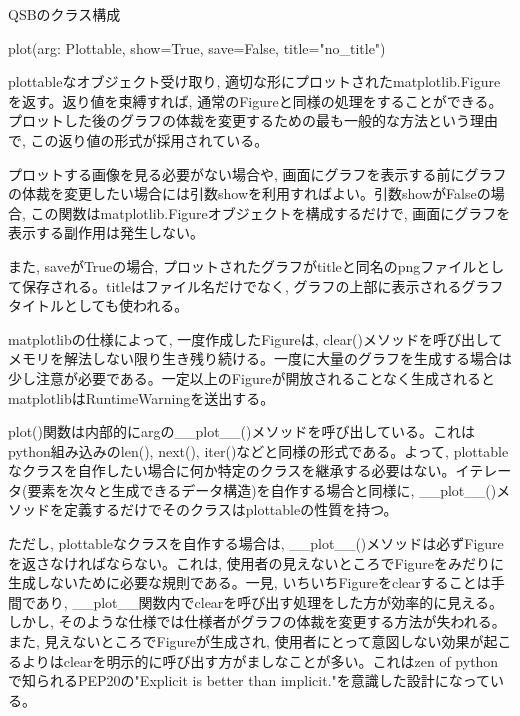\documentclass[a4paper, lualatex]{bxjsarticle}
\begin{document}
\begin{section}{QSBのクラス構成\label{AppQ}}
    \begin{section}{plot(arg: Plottable, show=True, save=False, title="no\_title")}
        \par plottableなオブジェクト受け取り, 適切な形にプロットされたmatplotlib.Figureを返す。返り値を束縛すれば, 通常のFigureと同様の処理をすることができる。プロットした後のグラフの体裁を変更するための最も一般的な方法という理由で, この返り値の形式が採用されている。
        \par プロットする画像を見る必要がない場合や, 画面にグラフを表示する前にグラフの体裁を変更したい場合には引数showを利用すればよい。引数showがFalseの場合, この関数はmatplotlib.Figureオブジェクトを構成するだけで, 画面にグラフを表示する副作用は発生しない。
        \par また, saveがTrueの場合, プロットされたグラフがtitleと同名のpngファイルとして保存される。titleはファイル名だけでなく, グラフの上部に表示されるグラフタイトルとしても使われる。
        \par matplotlibの仕様によって, 一度作成したFigureは, clear()メソッドを呼び出してメモリを解法しない限り生き残り続ける。一度に大量のグラフを生成する場合は少し注意が必要である。一定以上のFigureが開放されることなく生成されるとmatplotlibはRuntimeWarningを送出する。
        \par plot()関数は内部的にargの\_\_plot\_\_()メソッドを呼び出している。これはpython組み込みのlen(), next(), iter()などと同様の形式である。よって, plottableなクラスを自作したい場合に何か特定のクラスを継承する必要はない。イテレータ(要素を次々と生成できるデータ構造)を自作する場合と同様に, \_\_plot\_\_()メソッドを定義するだけでそのクラスはplottableの性質を持つ。
        \par ただし, plottableなクラスを自作する場合は, \_\_plot\_\_()メソッドは必ずFigureを返さなければならない。これは, 使用者の見えないところでFigureをみだりに生成しないために必要な規則である。一見, いちいちFigureをclearすることは手間であり, \_\_plot\_\_関数内でclearを呼び出す処理をした方が効率的に見える。しかし, そのような仕様では仕様者がグラフの体裁を変更する方法が失われる。また, 見えないところでFigureが生成され, 使用者にとって意図しない効果が起こるよりはclearを明示的に呼び出す方がましなことが多い。これはzen of pythonで知られるPEP20\cite{pep20}の"Explicit is better than implicit."を意識した設計になっている。
    \end{section}

    \newpage


\end{section}
\end{document}
